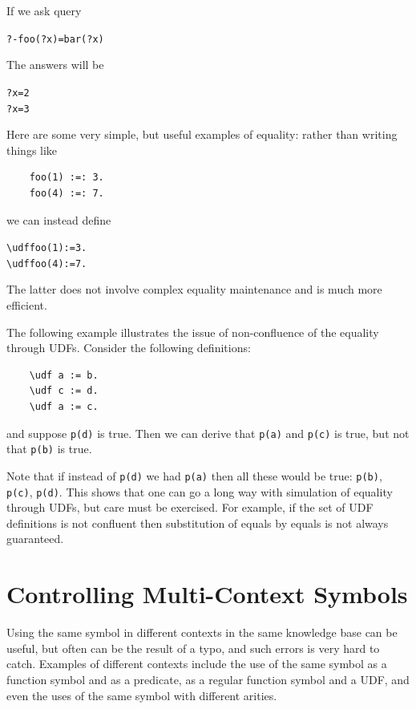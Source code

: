 \documentclass[11pt]{article}
\newcommand{\bs}{\textbackslash}
\begin{document}
If we ask query
\begin{alltt}
    ?- foo(?x)=bar(?x)
\end{alltt}
The answers will be
\begin{alltt}
    ?x=2
    ?x=3
\end{alltt}


Here are some very simple, but useful examples of equality: rather than
writing things like
\begin{verbatim}
    foo(1) :=: 3.
    foo(4) :=: 7.
\end{verbatim}
we can instead define
\begin{alltt}
    \bs{}udf foo(1):=3.
    \bs{}udf foo(4):=7.
\end{alltt}
The latter does not involve complex equality maintenance and is much more
efficient.

The following example illustrates the issue of non-confluence of the
equality through UDFs. Consider the following definitions:
\begin{verbatim}
    \udf a := b.
    \udf c := d.
    \udf a := c.
\end{verbatim}
and suppose \texttt{p(d)} is true. Then we can derive that \texttt{p(a)}
and \texttt{p(c)} is true, but not that \texttt{p(b)} is true.    

Note that if instead of \texttt{p(d)} we had \texttt{p(a)} then all these
would be true: \texttt{p(b)}, \texttt{p(c)}, \texttt{p(d)}.
This shows that one can go a long way
with simulation of equality through UDFs, but care must be exercised.
For example, if the set of UDF definitions is not confluent then
substitution of equals by equals is not always guaranteed.


\section{Controlling Multi-Context Symbols} \label{sec:symbol}


Using the same symbol in different contexts in the same knowledge base can be
useful, but often can be the result of a typo, and such errors is very hard
to catch. Examples of different contexts include the use of the same symbol
as a function symbol and as a predicate, as a regular function symbol and a
UDF, and even the uses of the same symbol with different arities.
\end{document}
